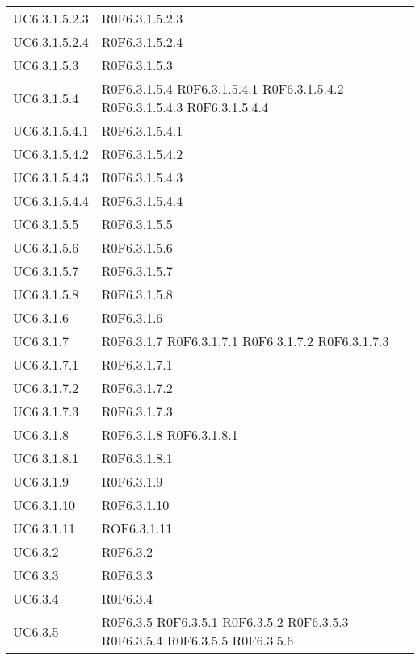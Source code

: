 \begin{longtable}{p{2.5cm}!{\VRule[1pt]}p{5.5cm}}
UC6.3.1.5.2.3 & R0F6.3.1.5.2.3\\
UC6.3.1.5.2.4 & R0F6.3.1.5.2.4\\
UC6.3.1.5.3 & R0F6.3.1.5.3\\
UC6.3.1.5.4 & R0F6.3.1.5.4
	\newline R0F6.3.1.5.4.1
	\newline R0F6.3.1.5.4.2
	\newline R0F6.3.1.5.4.3
	\newline R0F6.3.1.5.4.4\\
UC6.3.1.5.4.1 & R0F6.3.1.5.4.1\\
UC6.3.1.5.4.2 & R0F6.3.1.5.4.2\\
UC6.3.1.5.4.3 & R0F6.3.1.5.4.3\\
UC6.3.1.5.4.4 & R0F6.3.1.5.4.4\\
UC6.3.1.5.5 & R0F6.3.1.5.5\\
UC6.3.1.5.6 & R0F6.3.1.5.6\\
UC6.3.1.5.7 & R0F6.3.1.5.7\\
UC6.3.1.5.8 & R0F6.3.1.5.8\\
UC6.3.1.6 & R0F6.3.1.6\\
UC6.3.1.7 & R0F6.3.1.7
	\newline R0F6.3.1.7.1
	\newline R0F6.3.1.7.2
	\newline R0F6.3.1.7.3\\
UC6.3.1.7.1 & R0F6.3.1.7.1\\
UC6.3.1.7.2 & R0F6.3.1.7.2\\
UC6.3.1.7.3 & R0F6.3.1.7.3\\
UC6.3.1.8 & R0F6.3.1.8
	\newline R0F6.3.1.8.1\\
UC6.3.1.8.1 & R0F6.3.1.8.1\\
UC6.3.1.9 & R0F6.3.1.9\\
UC6.3.1.10 & R0F6.3.1.10\\ %
UC6.3.1.11 & ROF6.3.1.11\\ %
UC6.3.2 & R0F6.3.2\\
UC6.3.3 & R0F6.3.3\\
UC6.3.4 & R0F6.3.4\\
UC6.3.5 & R0F6.3.5
	\newline R0F6.3.5.1
	\newline R0F6.3.5.2
	\newline R0F6.3.5.3
	\newline R0F6.3.5.4
	\newline R0F6.3.5.5
	\newline R0F6.3.5.6

\end{longtable}
